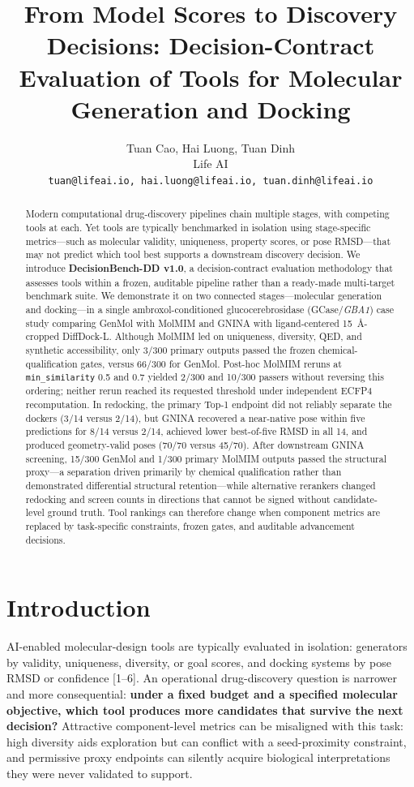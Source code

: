 \documentclass{article}
\title{From Model Scores to Discovery Decisions: Decision-Contract Evaluation of Tools for Molecular Generation and Docking}
\author{%
  Tuan Cao, Hai Luong, Tuan Dinh \\
  Life AI \\
  \texttt{tuan@lifeai.io, hai.luong@lifeai.io, tuan.dinh@lifeai.io}
}
\begin{document}
\maketitle

\begin{abstract}
Modern computational drug-discovery pipelines chain multiple stages, with competing tools at each. Yet tools are typically benchmarked in isolation using stage-specific metrics---such as molecular validity, uniqueness, property scores, or pose RMSD---that may not predict which tool best supports a downstream discovery decision. We introduce \textbf{DecisionBench-DD v1.0}, a decision-contract evaluation methodology that assesses tools within a frozen, auditable pipeline rather than a ready-made multi-target benchmark suite. We demonstrate it on two connected stages---molecular generation and docking---in a single ambroxol-conditioned glucocerebrosidase (GCase/\textit{GBA1}) case study comparing GenMol with MolMIM and GNINA with ligand-centered 15~\AA-cropped DiffDock-L. Although MolMIM led on uniqueness, diversity, QED, and synthetic accessibility, only 3/300 primary outputs passed the frozen chemical-qualification gates, versus 66/300 for GenMol. Post-hoc MolMIM reruns at \texttt{min\_similarity} 0.5 and 0.7 yielded 2/300 and 10/300 passers without reversing this ordering; neither rerun reached its requested threshold under independent ECFP4 recomputation. In redocking, the primary Top-1 endpoint did not reliably separate the dockers (3/14 versus 2/14), but GNINA recovered a near-native pose within five predictions for 8/14 versus 2/14, achieved lower best-of-five RMSD in all 14, and produced geometry-valid poses (70/70 versus 45/70). After downstream GNINA screening, 15/300 GenMol and 1/300 primary MolMIM outputs passed the structural proxy---a separation driven primarily by chemical qualification rather than demonstrated differential structural retention---while alternative rerankers changed redocking and screen counts in directions that cannot be signed without candidate-level ground truth. Tool rankings can therefore change when component metrics are replaced by task-specific constraints, frozen gates, and auditable advancement decisions.
\end{abstract}

\section{Introduction}

AI-enabled molecular-design tools are typically evaluated in isolation: generators by validity, uniqueness, diversity, or goal scores, and docking systems by pose RMSD or confidence [1--6]. An operational drug-discovery question is narrower and more consequential: \textbf{under a fixed budget and a specified molecular objective, which tool produces more candidates that survive the next decision?} Attractive component-level metrics can be misaligned with this task: high diversity aids exploration but can conflict with a seed-proximity constraint, and permissive proxy endpoints can silently acquire biological interpretations they were never validated to support.
\end{document}
